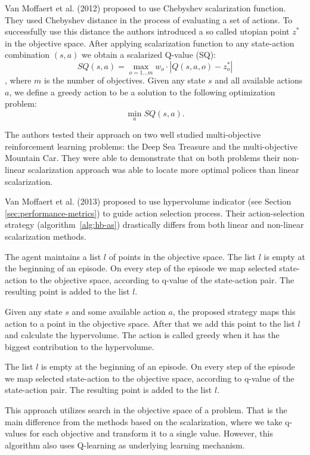 Van Moffaert et al. (2012)\nocite{van2012scalarized} proposed to use Chebyshev scalarization function. They used Chebyshev distance in the process of evaluating a set of actions. To successfully use this distance the authors introduced a so called utopian point $z^{*}$ in the objective space. After applying scalarization function to any state-action combination $(s,a)$ we obtain a scalarized Q-value (SQ):
$$ SQ(s,a) = \max_{o=1...m} w_{o} \cdot | Q(s,a,o) - z^{*}_{o} | $$
, where $m$ is the number of objectives. Given any state $s$ and all available actions $a$, we define a greedy action to be a solution to the following optimization problem:
$$ \min_{a} SQ(s,a). $$

The authors tested their approach on two well studied multi-objective reinforcement learning problems: the Deep Sea Treasure and the multi-objective Mountain Car. They were able to demonstrate that on both problems their non-linear scalarization approach was able to locate more optimal polices than linear scalarization.

Van Moffaert et al. (2013)\nocite{van2013hypervolume} proposed to use hypervolume indicator (see Section \ref{sec:performance-metrics}) to guide action selection process. Their action-selection strategy (algorithm~\ref{alg:hb-as}) drastically differs from both linear and non-linear scalarization methods.

The agent maintains a list $l$ of points in the objective space. The list $l$ is empty at the beginning of an episode. On every step of the episode we map selected state-action to the objective space, according to q-value of the state-action pair. The resulting point is added to the list $l$.

Given any state $s$ and some available action $a$, the proposed strategy maps this action to a point in the objective space. After that we add this point to the list $l$ and calculate the hypervolume. The action is called greedy when it has the biggest contribution to the hypervolume.

The list $l$ is empty at the beginning of an episode. On every step of the episode we map selected state-action to the objective space, according to q-value of the state-action pair. The resulting point is added to the list $l$.

This approach utilizes search in the objective space of a problem. That is the main difference from the methods based on the scalarization, where we take q-values for each objective and transform it to a single value. However, this algorithm also uses Q-learning as underlying learning mechanism.

